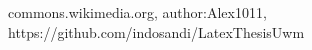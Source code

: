 \renewcommand\bibname{References}
\begin{thebibliography}{99}
 commons.wikimedia.org, author:Alex1011, 
 https://github.com/indosandi/LatexThesisUwm
\end{thebibliography}
